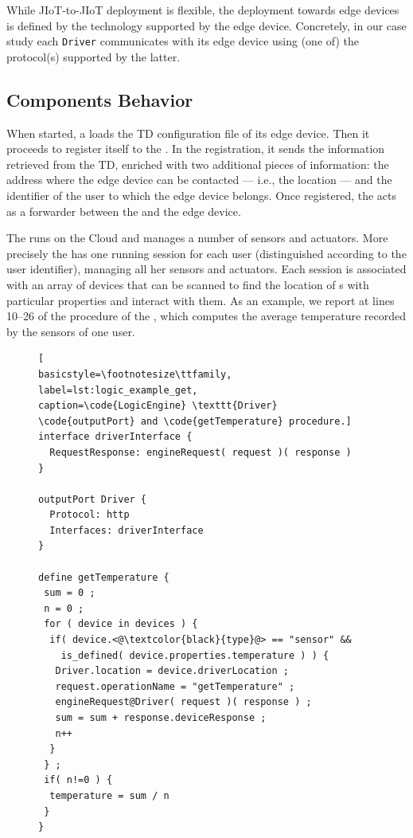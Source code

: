 While JIoT-to-JIoT deployment is flexible, the deployment towards edge devices
is defined by the technology supported by the edge device. Concretely, in our
case study each \texttt{Driver} communicates with its edge device using (one
of) the protocol(s) supported by the latter.


\subsection{Components Behavior}

When started, a  loads the TD configuration file of its edge
device. Then it proceeds to register itself to the . In the
registration, it sends the information retrieved from the TD, enriched with two
additional pieces of information: the address where the edge device can be
contacted --- i.e., the  location --- and the identifier of the
user to which the edge device belongs. Once registered, the  acts
as a forwarder between the  and the edge device.

The  runs on the Cloud and manages a number of sensors and
actuators. More precisely the  has one running session for
each user (distinguished according to the user identifier), managing all her
sensors and actuators. Each session is associated with an array of devices
that can be scanned to find the location of s with particular
properties and interact with them. As an example, we report at lines 10--26 of
 the procedure  of the
, which computes the average temperature recorded by the
sensors of one user.
%
\begin{figure}[b]
\begin{lstlisting}[
basicstyle=\footnotesize\ttfamily,
label=lst:logic_example_get,
caption=\code{LogicEngine} \texttt{Driver} \code{outputPort} and \code{getTemperature} procedure.]
interface driverInterface {
  RequestResponse: engineRequest( request )( response )
}

outputPort Driver {
  Protocol: http
  Interfaces: driverInterface
}

define getTemperature {
 sum = 0 ;
 n = 0 ;
 for ( device in devices ) {
  if( device.<@\textcolor{black}{type}@> == "sensor" &&
    is_defined( device.properties.temperature ) ) {
   Driver.location = device.driverLocation ;
   request.operationName = "getTemperature" ;
   engineRequest@Driver( request )( response ) ;
   sum = sum + response.deviceResponse ;
   n++
  }
 } ;
 if( n!=0 ) {
  temperature = sum / n
 }
}
\end{lstlisting}
\end{figure}

